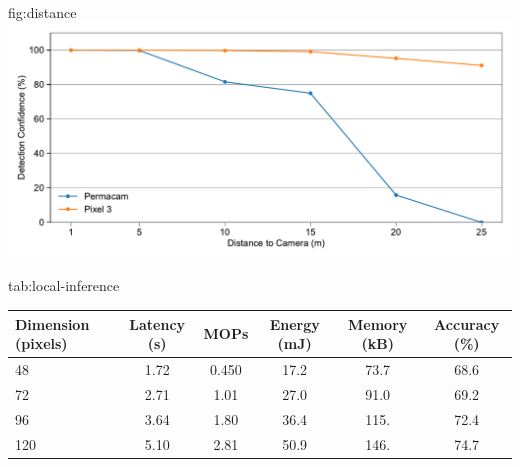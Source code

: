 \begin{definefigure}{fig:distance}
    \centering
    \includegraphics[width=\columnwidth]{figs/permacam/permacam_processing/distance_detection.pdf}
    \caption{
        Detection confidence as distance from camera to person is increased. Compared to a modern smartphone camera, the camera on \name can not compete due to limited resolution. However, images captured by \name still enable person detection at a distance of 15-20 meters. This distance is generally sufficient for most indoor spaces.
    }
\end{definefigure}

\begin{definetable}{tab:local-inference}
\begin{tabularx}{\columnwidth}{l c c c c c}
Dimension (pixels) & Latency (s) & MOPs & Energy (mJ) & Memory (kB) & Accuracy (\%) \\
\hline
48 & 1.72 & 0.450 & 17.2 & 73.7 & 68.6 \\
72 & 2.71 & 1.01 & 27.0 & 91.0 & 69.2 \\
96 & 3.64 & 1.80 & 36.4 & 115. & 72.4 \\
120 & 5.10 & 2.81 & 50.9 & 146. & 74.7 \\
\end{tabularx}
\caption {
    Latency, millions of operations, energy, peak memory, and accuracy 
    of local person classification. Images must be downscaled from full resolution, as inference on a 320x320 image requires too much runtime memory. The quantized version of model weights are used to measure accuracy of the validation set. The highest accuracy achieved is only 74.7\%, and requires 5.1 seconds of continuous computation.
}
\end{definetable}

